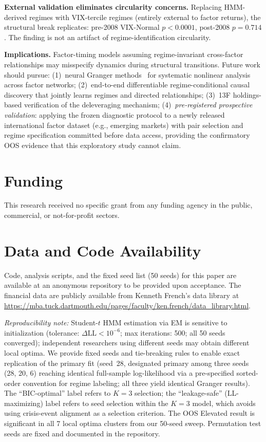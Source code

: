 \documentclass[sigconf,anonymous]{acmart}
\begin{document}
\textbf{External validation eliminates circularity concerns.}
Replacing HMM-derived regimes with VIX-tercile regimes (entirely external
to factor returns), the structural break replicates: pre-2008 VIX-Normal
$p < 0.0001$, post-2008 $p = 0.714$. The finding is not an artifact
of regime-identification circularity.

\textbf{Implications.} Factor-timing models assuming regime-invariant cross-factor
relationships may misspecify dynamics during structural transitions.
Future work should pursue:
(1)~neural Granger methods~\cite{tank2022neural} for systematic
nonlinear analysis across factor networks;
(2)~end-to-end differentiable regime-conditional causal discovery
that jointly learns regimes and directed relationships;
(3)~13F holdings-based verification of the deleveraging mechanism;
(4)~\emph{pre-registered prospective validation}: applying the
frozen diagnostic protocol to a newly released international
factor dataset (e.g., emerging markets) with pair selection
and regime specification committed before data access,
providing the confirmatory OOS evidence that this exploratory
study cannot claim.

\section*{Funding}

This research received no specific grant from any funding agency in the public,
commercial, or not-for-profit sectors.

\section*{Data and Code Availability}

Code, analysis scripts, and the fixed seed list (50 seeds) for this paper are
available at an anonymous repository to be provided upon acceptance. The
financial data are publicly available from Kenneth French's data library at
\url{https://mba.tuck.dartmouth.edu/pages/faculty/ken.french/data_library.html}.

\emph{Reproducibility note:} Student-$t$ HMM estimation via EM is sensitive
to initialization (tolerance: $\Delta\text{LL} < 10^{-6}$; max iterations: 500;
all 50 seeds converged); independent researchers using different seeds may
obtain different local optima. We provide fixed seeds and tie-breaking rules
to enable exact replication of the primary fit (seed~28, designated
primary among three seeds (28, 20, 6) reaching identical full-sample
log-likelihood via a pre-specified sorted-order convention for regime
labeling; all three yield identical Granger results).
The ``BIC-optimal'' label refers to $K = 3$ selection; the ``leakage-safe''
(LL-maximizing) label refers to seed selection within the $K = 3$ model,
which avoids using crisis-event alignment as a selection criterion.
The OOS Elevated result is significant in all 7 local optima clusters from
our 50-seed sweep. Permutation test seeds are fixed and documented in the
repository.
\end{document}
